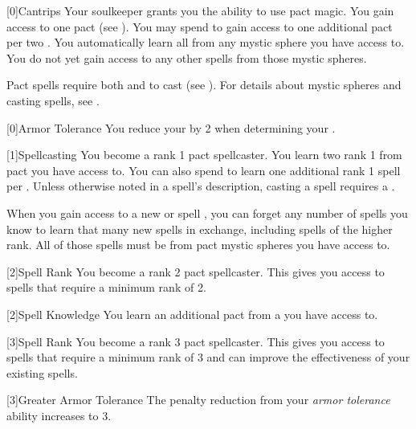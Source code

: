         [0]{Cantrips}
        Your soulkeeper grants you the ability to use pact magic.
        You gain access to one pact  (see ).
        You may spend  to gain access to one additional pact  per two .
        You automatically learn all  from any mystic sphere you have access to.
        You do not yet gain access to any other spells from those mystic spheres.

        Pact spells require both  and  to cast (see ).
        For details about mystic spheres and casting spells, see .

        [0]{Armor Tolerance} You reduce your  by 2 when determining your .

        [1]{Spellcasting}
        You become a rank 1 pact spellcaster.
        You learn two rank 1  from pact  you have access to.
        You can also spend  to learn one additional rank 1 spell per .
        Unless otherwise noted in a spell's description, casting a spell requires a .

        When you gain access to a new  or spell ,
            you can forget any number of spells you know to learn that many new spells in exchange,
            including spells of the higher rank.
        All of those spells must be from pact mystic spheres you have access to.

        [2]{Spell Rank} You become a rank 2 pact spellcaster.
        This gives you access to spells that require a minimum rank of 2.

        [2]{Spell Knowledge} You learn an additional pact  from a  you have access to.

        [3]{Spell Rank} You become a rank 3 pact spellcaster.
        This gives you access to spells that require a minimum rank of 3 and can improve the effectiveness of your existing spells.

        [3]{Greater Armor Tolerance} The penalty reduction from your \textit{armor tolerance} ability increases to 3.

